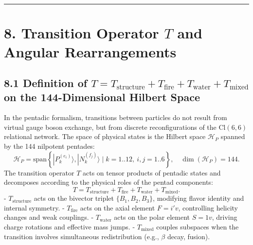 \documentclass[11pt]{article}
\let\oldmathcal\mathcal
\renewcommand{\mathcal}[1]{\oldmathcal{#1}}
\begin{document}
\begin{center}\rule{0.5\linewidth}{0.5pt}\end{center}

\hypertarget{transition-operator-t-and-angular-rearrangements}{%
\section{\texorpdfstring{8. Transition Operator \(T\) and Angular
Rearrangements}{8. Transition Operator T and Angular Rearrangements}}\label{transition-operator-t-and-angular-rearrangements}}

\hypertarget{definition-of-t-t_textstructure-t_textfire-t_textwater-t_textmixed-on-the-144-dimensional-hilbert-space}{%
\subsection{\texorpdfstring{8.1 Definition of
\(T = T_{\text{structure}} + T_{\text{fire}} + T_{\text{water}} + T_{\text{mixed}}\)
on the 144-Dimensional Hilbert
Space}{8.1 Definition of T = T\_\{\textbackslash text\{structure\}\} + T\_\{\textbackslash text\{fire\}\} + T\_\{\textbackslash text\{water\}\} + T\_\{\textbackslash text\{mixed\}\} on the 144-Dimensional Hilbert Space}}\label{definition-of-t-t_textstructure-t_textfire-t_textwater-t_textmixed-on-the-144-dimensional-hilbert-space}}

In the pentadic formalism, transitions between particles do not result
from virtual gauge boson exchange, but from discrete reconfigurations of
the \(\text{Cl}(6,6)\) relational network. The space of physical states
is the Hilbert space \(\mathcal{H}_P\) spanned by the 144 nilpotent
pentades: \[
\mathcal{H}_P = \text{span}\left\{ |P_k^{(e_i)}\rangle, |N_k^{(f_j)}\rangle \mid k=1..12,\ i,j=1..6 \right\}, \quad \dim(\mathcal{H}_P) = 144.
\] The transition operator \(T\) acts on tensor products of pentadic
states and decomposes according to the physical roles of the pentad
components: \[
T = T_{\text{structure}} + T_{\text{fire}} + T_{\text{water}} + T_{\text{mixed}}.
\] - \(T_{\text{structure}}\) acts on the bivector triplet
\(\{B_1, B_2, B_3\}\), modifying flavor identity and internal symmetry.
- \(T_{\text{fire}}\) acts on the axial element \(F = i'v\), controlling
helicity changes and weak couplings. - \(T_{\text{water}}\) acts on the
polar element \(S = 1v\), driving charge rotations and effective mass
jumps. - \(T_{\text{mixed}}\) couples subspaces when the transition
involves simultaneous redistribution (e.g., \(\beta\) decay, fusion).
\end{document}
